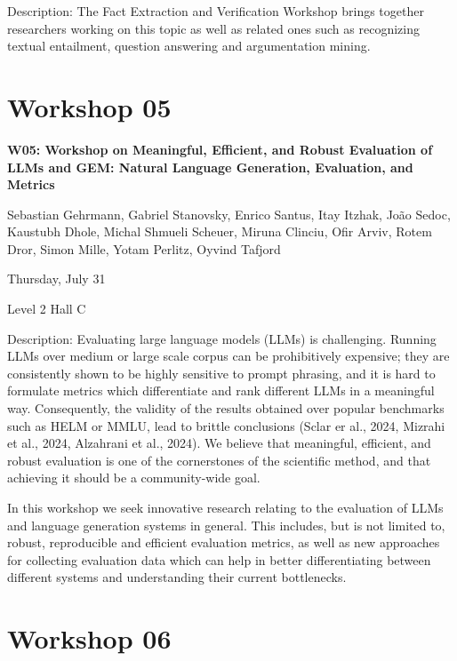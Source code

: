 Description: The Fact Extraction and Verification Workshop brings together researchers working on this topic as well as related ones such as recognizing textual entailment, question answering and argumentation mining.

\clearpage


\section[W05: Workshop on Meaningful, Efficient, and Robust Evaluation of LLMs and GEM: Natural Language Generation, Evaluation, and Metrics]{Workshop 05}

\begin{center}
    {\Large \textbf{W05: Workshop on Meaningful, Efficient, and Robust Evaluation of LLMs and GEM: Natural Language Generation, Evaluation, and Metrics}}

    Sebastian Gehrmann, Gabriel Stanovsky, Enrico Santus, Itay Itzhak, João Sedoc, Kaustubh Dhole, Michal Shmueli Scheuer, Miruna Clinciu, Ofir Arviv, Rotem Dror, Simon Mille, Yotam Perlitz, Oyvind Tafjord

    Thursday, July 31
    
    Level 2 Hall C

\end{center}

Description: Evaluating large language models (LLMs) is challenging. Running LLMs over medium or large scale corpus can be prohibitively expensive; they are consistently shown to be highly sensitive to prompt phrasing, and it is hard to formulate metrics which differentiate and rank different LLMs in a meaningful way. Consequently, the validity of the results obtained over popular benchmarks such as HELM or MMLU, lead to brittle conclusions (Sclar er al., 2024, Mizrahi et al., 2024, Alzahrani et al., 2024). We believe that meaningful, efficient, and robust evaluation is one of the cornerstones of the scientific method, and that achieving it should be a community-wide goal.

In this workshop we seek innovative research relating to the evaluation of LLMs and language generation systems in general. This includes, but is not limited to, robust, reproducible and efficient evaluation metrics, as well as new approaches for collecting evaluation data which can help in better differentiating between different systems and understanding their current bottlenecks.


\clearpage


\section[W06: The 19th Linguistic Annotation Workshop (LAW XIX)]{Workshop 06}

